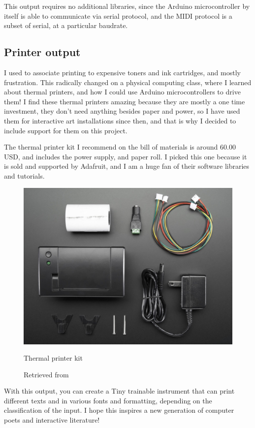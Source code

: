 This output requires no additional libraries, since the Arduino microcontroller by itself is able to communicate via serial protocol, and the MIDI protocol is a subset of serial, at a particular baudrate.

\subsection{Printer output}

I used to associate printing to expensive toners and ink cartridges, and mostly frustration. This radically changed on a physical computing class, where I learned about thermal printers, and how I could use Arduino microcontrollers to drive them! I find these thermal printers amazing because they are mostly a one time investment, they don't need anything besides paper and power, so I have used them for interactive art installations since then, and that is why I decided to include support for them on this project.

The thermal printer kit I recommend on the bill of materials is around 60.00 USD, and includes the power supply, and paper roll. I picked this one because it is sold and supported by Adafruit, and I am a huge fan of their software libraries and tutorials. 

\begin{figure}[ht]
  \centering
  \includegraphics[width=0.75\linewidth,height=0.25\textheight,keepaspectratio]{images/materials-adafruit-thermal-printer.jpg}
  \caption{Thermal printer kit}
  \caption*{Retrieved from \cite{website-materials-adafruit-thermal-printer}}
  \label{fig:materials-adafruit-thermal-printer}
\end{figure}

With this output, you can create a Tiny trainable instrument that can print different texts and in various fonts and formatting, depending on the classification of the input. I hope this inspires a new generation of computer poets and interactive literature!

